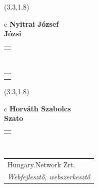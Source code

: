 \documentclass[11pt]{article}
\begin{document}
\makebox(3.3,1.8){
  \renewcommand\arraystretch{1.3}
  \begin{tabular}[c]{c}
    \hspace{8.5mm}
    \LARGE\bf{ Nyitrai József }\\
    \hspace{8.5mm}
    \Large{ Józsi }\\
    \renewcommand\arraystretch{3}
    \begin{tabular}[c]{c}
      \centering
      \fontfamily{phv}\selectfont{
        \textbf{
          \textsc{
            \scriptsize{
            \color{Bright}{ Ismerkedő }\color{Bright}{ Webmester }\color{Bright}{ Sminkmester }\color{Dark}{ Programozó }
            }
          }
        }
      }
    \end{tabular}
    \\
    \renewcommand\arraystretch{1}
    \begin{tabular}{p{3.3in}}
      \hspace{.7cm}\\
      \hspace{.7cm}\emph{  }\\
    \end{tabular}
  \end{tabular}
}

\makebox(3.3,1.8){
  \renewcommand\arraystretch{1.3}
  \begin{tabular}[c]{c}
    \hspace{8.5mm}
    \LARGE\bf{ Horváth Szabolcs }\\
    \hspace{8.5mm}
    \Large{ Szato }\\
    \renewcommand\arraystretch{3}
    \begin{tabular}[c]{c}
      \centering
      \fontfamily{phv}\selectfont{
        \textbf{
          \textsc{
            \scriptsize{
            \color{Bright}{ Ismerkedő }\color{Dark}{ Webmester }\color{Dark}{ Sminkmester }\color{Bright}{ Programozó }
            }
          }
        }
      }
    \end{tabular}
    \\
    \renewcommand\arraystretch{1}
    \begin{tabular}{p{3.3in}}
      \hspace{.7cm}Hungary.Network Zrt.\\
      \hspace{.7cm}\emph{ Webfejlesztő, webszerkesztő }\\
    \end{tabular}
  \end{tabular}
}
\end{document}
